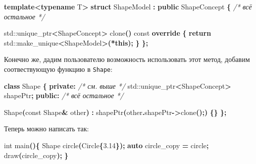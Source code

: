 \documentclass[14pt,a4paper]{article}
\newenvironment{Shaded}{\begin{paragraph}}{\end{paragraph}}
\newenvironment{Highlighting}{\begin{paragraph}}{\end{paragraph}}
\newcommand{\KeywordTok}[1]{\textcolor[rgb]{0.13,0.29,0.53}{\textbf{#1}}}
\newcommand{\DataTypeTok}[1]{\textcolor[rgb]{0.13,0.29,0.53}{#1}}
\newcommand{\FloatTok}[1]{\textcolor[rgb]{0.00,0.00,0.81}{#1}}
\newcommand{\CommentTok}[1]{\textcolor[rgb]{0.56,0.35,0.01}{\textit{#1}}}
\newcommand{\ControlFlowTok}[1]{\textcolor[rgb]{0.13,0.29,0.53}{\textbf{#1}}}
\newcommand{\OperatorTok}[1]{\textcolor[rgb]{0.81,0.36,0.00}{\textbf{#1}}}
\newcommand{\BuiltInTok}[1]{#1}
\newcommand{\AttributeTok}[1]{\textcolor[rgb]{0.77,0.63,0.00}{#1}}
\newcommand{\NormalTok}[1]{#1}
\begin{document}
\begin{Shaded}
\begin{Highlighting}[]

\KeywordTok{template}\OperatorTok{\textless{}}\KeywordTok{typename}\NormalTok{ T}\OperatorTok{\textgreater{}}
\KeywordTok{struct}\NormalTok{ ShapeModel }\OperatorTok{:}
\KeywordTok{public}\NormalTok{ ShapeConcept }\OperatorTok{\{}
\CommentTok{/* всё остальное */}

\BuiltInTok{std::}\NormalTok{unique\_ptr}\OperatorTok{\textless{}}\NormalTok{ShapeConcept}\OperatorTok{\textgreater{}}\NormalTok{ clone}\OperatorTok{()} \AttributeTok{const} \KeywordTok{override} \OperatorTok{\{}
\ControlFlowTok{return} \BuiltInTok{std::}\NormalTok{make\_unique}\OperatorTok{\textless{}}\NormalTok{ShapeModel}\OperatorTok{\textgreater{}(*}\KeywordTok{this}\OperatorTok{);}
\OperatorTok{\}}
\OperatorTok{\};}
\end{Highlighting}
\end{Shaded}

Конечно же, дадим пользователю возможность использовать этот метод,
добавим соотвествующую функцию в \texttt{Shape}:

\begin{Shaded}
\begin{Highlighting}[]
\KeywordTok{class}\NormalTok{ Shape }\OperatorTok{\{}
\KeywordTok{private}\OperatorTok{:}
    \CommentTok{/* см. выше */}
    \BuiltInTok{std::}\NormalTok{unique\_ptr}\OperatorTok{\textless{}}\NormalTok{ShapeConcept}\OperatorTok{\textgreater{}}\NormalTok{ shapePtr}\OperatorTok{;}
\KeywordTok{public}\OperatorTok{:}
    \CommentTok{/* всё остальное */}
    
\NormalTok{    Shape}\OperatorTok{(}\AttributeTok{const}\NormalTok{ Shape}\OperatorTok{\&}\NormalTok{ other}\OperatorTok{)} 
        \OperatorTok{:}\NormalTok{ shapePtr}\OperatorTok{(}\NormalTok{other}\OperatorTok{.}\NormalTok{shapePtr}\OperatorTok{{-}\textgreater{}}\NormalTok{clone}\OperatorTok{();)} \OperatorTok{\{\}}
\OperatorTok{\};}
\end{Highlighting}
\end{Shaded}

Теперь можно написать так:

\begin{Shaded}
\begin{Highlighting}[]
\DataTypeTok{int}\NormalTok{ main}\OperatorTok{()\{}
\NormalTok{    Shape circle}\OperatorTok{(}\NormalTok{Circle}\OperatorTok{\{}\FloatTok{3.14}\OperatorTok{\});}
    \KeywordTok{auto}\NormalTok{ circle\_copy }\OperatorTok{=}\NormalTok{ circle}\OperatorTok{;}
\NormalTok{    draw}\OperatorTok{(}\NormalTok{circle\_copy}\OperatorTok{);}
\OperatorTok{\}}
\end{Highlighting}
\end{Shaded}
\end{document}
